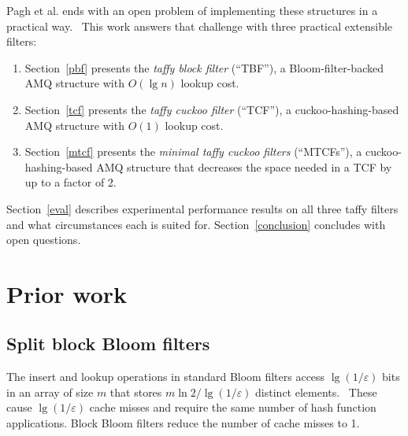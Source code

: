 \documentclass[letterpaper,twocolumn,10pt]{article}
\newcommand{\etal}{et al.}
\begin{document}

Pagh \etal{} ends with an open problem of implementing these structures in a practical way.~\cite{psw}
This work answers that challenge with three practical extensible filters:

\begin{enumerate}
\item Section~\ref{pbf}  presents the {\em taffy block filter}           (``TBF''),   a Bloom-filter-backed  AMQ structure with $O(\lg n)$ lookup cost.
\item Section~\ref{tcf}  presents the {\em taffy cuckoo filter}          (``TCF''),   a cuckoo-hashing-based AMQ structure with $O(1)$ lookup cost.
\item Section~\ref{mtcf} presents the {\em minimal taffy cuckoo filters} (``MTCFs''), a cuckoo-hashing-based AMQ structure that decreases the space needed in a TCF by up to a factor of 2.
\end{enumerate}

Section~\ref{eval} describes experimental performance results on all three taffy filters and what circumstances each is suited for. %
Section~\ref{conclusion} concludes with open questions.


\section{Prior work}

\subsection{Split block Bloom filters}



The insert and lookup operations in standard Bloom filters access $\lg (1/\varepsilon)$ bits in an array of size $m$ that stores $m \ln 2 / \lg(1/\varepsilon)$ distinct elements.~\cite{bloom-original}
These cause $\lg (1/\varepsilon)$ cache misses and require the same number of hash function applications.
Block Bloom filters reduce the number of cache misses to 1.~\cite{block-bloom}
\end{document}
